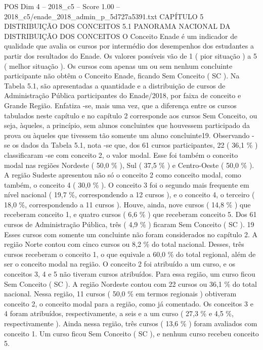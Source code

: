 \begin{textsample}{POS Dim 4 – 2018\_c5 – Score 1.00 – 2018\_c5/enade\_2018\_admin\_p\_5d727a5391.txt}  \label{ex:f4_pos_222}
CAPÍTULO 5 DISTRIBUIÇÃO DOS CONCEITOS 5.1 PANORAMA NACIONAL DA DISTRIBUIÇÃO DOS CONCEITOS O Conceito Enade é um indicador de qualidade que avalia os cursos por intermédio dos desempenhos dos estudantes a partir dos resultados do Enade.
Os valores possíveis vão de 1 ( pior situação ) a 5 ( melhor situação ).
Os cursos com apenas um ou sem nenhum concluinte participante não obtêm o Conceito Enade, ficando Sem Conceito ( SC ).
Na Tabela 5.1, são apresentadas a quantidade e a distribuição de cursos de Administração Pública participantes do Enade/2018, por faixa de conceito e Grande Região.
Enfatiza -se, mais uma vez, que a diferença entre os cursos tabulados neste capítulo e no capítulo 2 corresponde aos cursos Sem Conceito, ou seja, àqueles, a princípio, sem alunos concluintes que houvessem participado da prova ou àqueles que tivessem tão somente um aluno concluinte19.
Observando -se os dados da Tabela 5.1, nota -se que, dos 61 cursos participantes, 22 ( 36,1 \% ) classificaram -se com conceito 2, o valor modal.
Esse foi também o conceito modal nas regiões Nordeste ( 50,0 \% ), Sul ( 37,5 \% ) e Centro-Oeste ( 50,0 \% ).
A região Sudeste apresentou não só o conceito 2 como conceito modal, como também, o conceito 4 ( 30,0 \% ).
O conceito 3 foi o segundo mais frequente em nível nacional ( 19,7 \%, correspondendo a 12 cursos ), e o conceito 4, o terceiro ( 18,0 \%, correspondendo a 11 cursos ).
Houve, ainda, nove cursos ( 14,8 \% ) que receberam conceito 1, e quatro cursos ( 6,6 \% ) que receberam conceito 5.
Dos 61 cursos de Administração Pública, três ( 4,9 \% ) ficaram Sem Conceito ( SC ). 19 Esses cursos com somente um concluinte não foram considerados no capítulo 2.
A região Norte contou com cinco cursos ou 8,2 \% do total nacional.
Desses, três cursos receberam o conceito 1, o que equivale a 60,0 \% do total regional, além de ser o conceito modal na região.
O conceito 2 foi atribuído a um curso, e os conceitos 3, 4 e 5 não tiveram cursos atribuídos.
Para essa região, um curso ficou Sem Conceito ( SC ).
A região Nordeste contou com 22 cursos ou 36,1 \% do total nacional.
Nessa região, 11 cursos ( 50,0 \% em termos regionais ) obtiveram conceito 2, o conceito modal para a região, como já comentado.
Os conceitos 3 e 4 foram atribuídos, respectivamente, a seis e a um curso ( 27,3 \% e 4,5 \%, respectivamente ).
Ainda nessa região, três cursos ( 13,6 \% ) foram avaliados com conceito 1.
Um curso ficou Sem Conceito ( SC ), e nenhum curso recebeu conceito 5.

\end{textsample}
